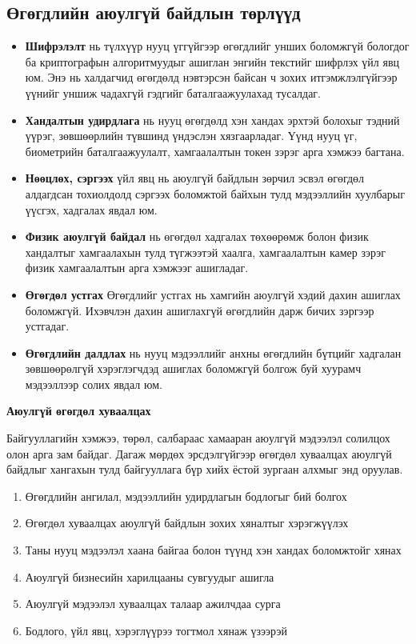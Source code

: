 \subsection{Өгөгдлийн аюулгүй байдлын төрлүүд}
\begin{itemize}
    \item \textbf{Шифрэлэлт} нь түлхүүр нууц үггүйгээр өгөгдлийг унших боломжгүй бологдог ба криптографын алгоритмуудыг ашиглан энгийн текстийг шифрлэх үйл явц юм. Энэ нь халдагчид өгөгдөлд нэвтэрсэн байсан ч зохих итгэмжлэлгүйгээр үүнийг уншиж чадахгүй гэдгийг баталгаажуулахад тусалдаг.
    \item \textbf{Хандалтын удирдлага} нь нууц өгөгдөлд хэн хандах эрхтэй болохыг тэдний үүрэг, зөвшөөрлийн түвшинд үндэслэн хязгаарладаг. Үүнд нууц үг, биометрийн баталгаажуулалт, хамгаалалтын токен зэрэг арга хэмжээ багтана.
    \item \textbf{Нөөцлөх, сэргээх} үйл явц нь аюулгүй байдлын зөрчил эсвэл өгөгдөл алдагдсан тохиолдолд сэргээх боломжтой байхын тулд мэдээллийн хуулбарыг үүсгэх, хадгалах явдал юм.
    \item \textbf{Физик аюулгүй байдал} нь өгөгдөл хадгалах төхөөрөмж болон физик хандалтыг хамгаалахын тулд түгжээтэй хаалга, хамгаалалтын камер зэрэг физик хамгаалалтын арга хэмжээг ашигладаг.
    \item \textbf{Өгөгдөл устгах} Өгөгдлийг устгах нь хамгийн аюулгүй хэдий дахин ашиглах боломжгүй. Ихэвчлэн дахин ашиглахгүй өгөгдлийн дарж бичих зэргээр устгадаг.
    \item \textbf{Өгөгдлийн далдлах} нь нууц мэдээллийг анхны өгөгдлийн бүтцийг хадгалан зөвшөөрөлгүй хэрэглэгчдэд ашиглах боломжгүй болгож буй хуурамч мэдээллээр солих явдал юм.
\end{itemize}

\textbf{Аюулгүй өгөгдөл хуваалцах}

Байгууллагийн хэмжээ, төрөл, салбараас хамааран аюулгүй мэдээлэл солилцох олон арга зам байдаг. Дагаж мөрдөх эрсдэлгүйгээр өгөгдөл хуваалцах аюулгүй байдлыг хангахын тулд байгууллага бүр хийх ёстой зургаан алхмыг энд оруулав.

\begin{enumerate}
    \item Өгөгдлийн ангилал, мэдээллийн удирдлагын бодлогыг бий болгох
    \item Өгөгдөл хуваалцах аюулгүй байдлын зохих хяналтыг хэрэгжүүлэх
    \item Таны нууц мэдээлэл хаана байгаа болон түүнд хэн хандах боломжтойг хянах
    \item Аюулгүй бизнесийн харилцааны сувгуудыг ашигла
    \item Аюулгүй мэдээлэл хуваалцах талаар ажилчдаа сурга
    \item Бодлого, үйл явц, хэрэглүүрээ тогтмол хянаж үзээрэй
\end{enumerate}

